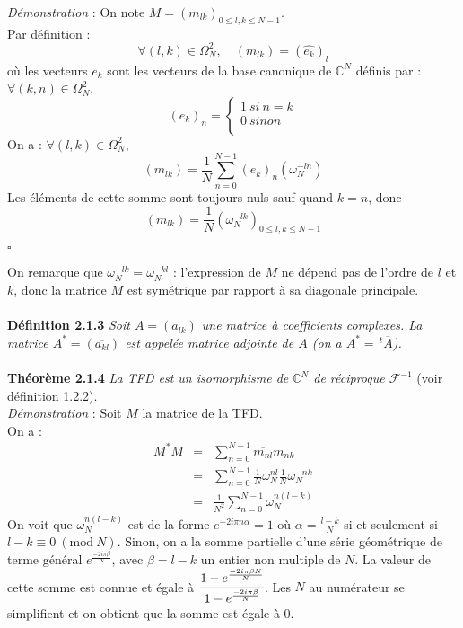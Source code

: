 \documentclass[12pt]{article}
\newcommand{\Mod}[1]{\ (\mathrm{mod}\ #1)}
\begin{document}
\textit{Démonstration} : On note $M=(m_{lk})_{0\leq l,k\leq N-1}$.\\ Par définition :
\begin{equation*}
\forall (l,k) \in \Omega_N^2,\quad (m_{lk})=(\widehat{e_k})_l
\end{equation*}
où les vecteurs $e_k$ sont les vecteurs de la base canonique de $\mathbb{C}^N$ définis par :\\
$\forall (k,n) \in \Omega_N^2$,
\[(e_k)_n=
\begin{cases}
1~si~n=k\\
0~sinon\\
\end{cases}
\]
On a : $\forall (l,k) \in \Omega_N^2$,
\begin{equation*}
(m_{lk})=\frac{1}{N}\sum_{n=0}^{N-1} (e_k)_n(\omega_N^{-ln})
\end{equation*}
Les éléments de cette somme sont toujours nuls sauf quand $k=n$, donc 
\begin{equation*}
(m_{lk})=\frac{1}{N}(\omega_N^{-lk})_{0\leq l,k\leq N-1}
\end{equation*}
\begin{flushright} $\square$ \end{flushright}
On remarque que $\omega_N^{-lk}=\omega_N^{-kl}$ : l'expression de $M$ ne dépend pas de l'ordre de $l$ et $k$, donc la matrice $M$ est symétrique par rapport à sa diagonale principale.\\\\
\textbf{Définition 2.1.3} \textit{Soit $A=(a_{lk})$ une matrice à coefficients complexes. La matrice $A^*=(\overline{a_{kl}})$ est appelée matrice adjointe de $A$ (on a $A^*=\,^t\overline{A}$).}\\\\
\textbf{Théorème 2.1.4} \textit{La TFD est un isomorphisme de $\mathbb{C}^N$ de réciproque $\mathcal{F}^{-1}$} (voir définition 1.2.2).\\
\textit{Démonstration} : Soit $M$ la matrice de la TFD.\\ On a :
\begin{eqnarray*}
M^*M&=&\sum_{n=0}^{N-1} \overline{m_{nl}}m_{nk}\\
&=&\sum_{n=0}^{N-1}\frac{1}{N}\omega_N^{nl}\frac{1}{N}\omega_N^{-nk}\\
&=&\frac{1}{N^2}\sum_{n=0}^{N-1}\omega_N^{n(l-k)}
\end{eqnarray*}
On voit que $\omega_N^{n(l-k)}$ est de la forme $e^{-{2i\pi n\alpha}}=1$ où $\alpha=\frac{l-k}{N}$ si et seulement si~$l-k \equiv 0 \Mod{N}$. Sinon, on a la somme partielle d'une série géométrique de terme général $e^{\frac{-2i\pi\beta}{N}}$, avec $\beta=l-k$ un entier non multiple de $N$. La valeur de cette somme est connue et égale à $\cfrac{1-e^{\frac{-2i\pi\beta N}{N}}}{1-e^{\frac{-2i\pi\beta}{N}}}$. Les $N$ au numérateur se simplifient et on obtient que la somme est égale à 0.\\
\end{document}
